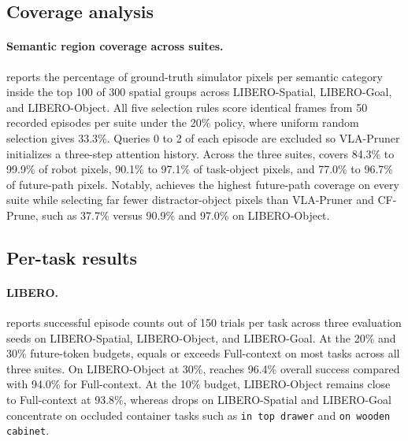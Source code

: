 

\subsection{Coverage analysis}
\label{app:supp_diagnostics}



\paragraph{Semantic region coverage across suites.}
     reports the percentage of ground-truth simulator pixels per semantic category inside the top 100 of 300 spatial groups across LIBERO-Spatial, LIBERO-Goal, and LIBERO-Object.
    All five selection rules score identical frames from 50 recorded episodes per suite under the 20\% \method policy, where uniform random selection gives 33.3\%.
    Queries 0 to 2 of each episode are excluded so VLA-Pruner initializes a three-step attention history.
    Across the three suites, \method covers 84.3\% to 99.9\% of robot pixels, 90.1\% to 97.1\% of task-object pixels, and 77.0\% to 96.7\% of future-path pixels.
    Notably, \method achieves the highest future-path coverage on every suite while selecting far fewer distractor-object pixels than VLA-Pruner and CF-Prune, such as 37.7\% versus 90.9\% and 97.0\% on LIBERO-Object.

\subsection{Per-task results}
\label{app:supp_pertask}



\paragraph{LIBERO.}
     reports successful episode counts out of 150 trials per task across three evaluation seeds on LIBERO-Spatial, LIBERO-Object, and LIBERO-Goal.
    At the 20\% and 30\% future-token budgets, \method equals or exceeds Full-context on most tasks across all three suites.
    On LIBERO-Object at 30\%, \method reaches 96.4\% overall success compared with 94.0\% for Full-context.
    At the 10\% budget, LIBERO-Object remains close to Full-context at 93.8\%, whereas drops on LIBERO-Spatial and LIBERO-Goal concentrate on occluded container tasks such as \texttt{in top drawer} and \texttt{on wooden cabinet}.


